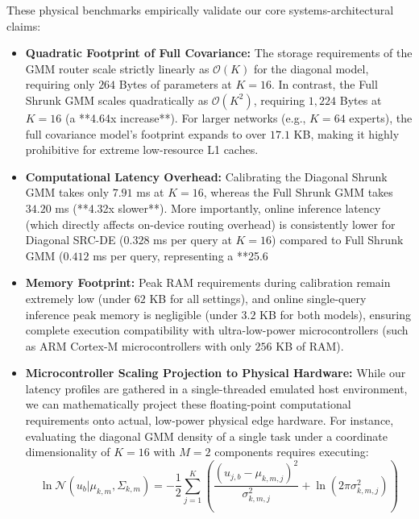 These physical benchmarks empirically validate our core systems-architectural claims:
\begin{itemize}
    \item {\bf Quadratic Footprint of Full Covariance:} The storage requirements of the GMM router scale strictly linearly as $\mathcal{O}(K)$ for the diagonal model, requiring only $264$ Bytes of parameters at $K=16$. In contrast, the Full Shrunk GMM scales quadratically as $\mathcal{O}(K^2)$, requiring $1,224$ Bytes at $K=16$ (a **4.64x increase**). For larger networks (e.g., $K=64$ experts), the full covariance model's footprint expands to over $17.1$ KB, making it highly prohibitive for extreme low-resource L1 caches.
    \item {\bf Computational Latency Overhead:} Calibrating the Diagonal Shrunk GMM takes only $7.91$ ms at $K=16$, whereas the Full Shrunk GMM takes $34.20$ ms (**4.32x slower**). More importantly, online inference latency (which directly affects on-device routing overhead) is consistently lower for Diagonal SRC-DE ($0.328$ ms per query at $K=16$) compared to Full Shrunk GMM ($0.412$ ms per query, representing a **25.6%
    \item {\bf Memory Footprint:} Peak RAM requirements during calibration remain extremely low (under $62$ KB for all settings), and online single-query inference peak memory is negligible (under $3.2$ KB for both models), ensuring complete execution compatibility with ultra-low-power microcontrollers (such as ARM Cortex-M microcontrollers with only $256$ KB of RAM).
    \item {\bf Microcontroller Scaling Projection to Physical Hardware:} While our latency profiles are gathered in a single-threaded emulated host environment, we can mathematically project these floating-point computational requirements onto actual, low-power physical edge hardware. For instance, evaluating the diagonal GMM density of a single task under a coordinate dimensionality of $K=16$ with $M=2$ components requires executing:
    \begin{equation}
    \label{submission:eq:diag_gmm_eval}
    \ln \mathcal{N}(u_b | \mu_{k,m}, \Sigma_{k,m}) = -\frac{1}{2} \sum_{j=1}^{K} \left( \frac{(u_{j,b} - \mu_{k,m,j})^2}{\sigma^2_{k,m,j}} + \ln(2\pi \sigma^2_{k,m,j}) \right)
    \end{equation}

\end{itemize}
